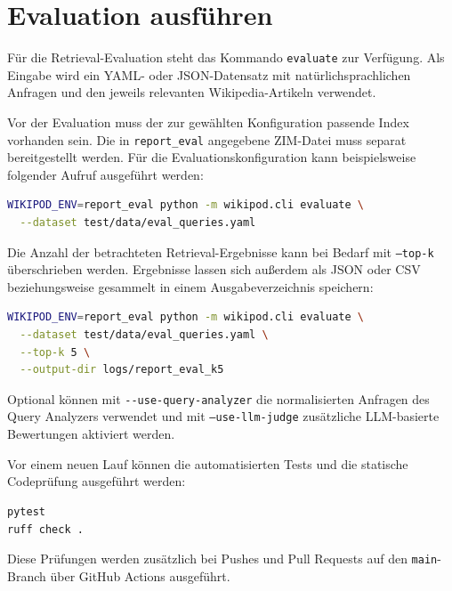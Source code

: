 \section{Evaluation ausführen}

Für die Retrieval-Evaluation steht das Kommando \texttt{evaluate} zur
Verfügung. Als Eingabe wird ein YAML- oder JSON-Datensatz mit
natürlichsprachlichen Anfragen und den jeweils relevanten Wikipedia-Artikeln
verwendet.

Vor der Evaluation muss der zur gewählten Konfiguration passende Index
vorhanden sein. Die in \texttt{report\_eval} angegebene ZIM-Datei muss
separat bereitgestellt werden. Für die Evaluationskonfiguration kann beispielsweise
folgender Aufruf ausgeführt werden:

\par\nopagebreak[4]\smallskip
\noindent\begin{minipage}[t]{\linewidth}
\vspace{0pt}
\begin{lstlisting}[language=bash]
WIKIPOD_ENV=report_eval python -m wikipod.cli evaluate \
  --dataset test/data/eval_queries.yaml
\end{lstlisting}
\end{minipage}\par\smallskip

Die Anzahl der betrachteten Retrieval-Ergebnisse kann bei Bedarf mit
\texttt{--top-k} überschrieben werden. Ergebnisse lassen sich außerdem als
JSON oder CSV beziehungsweise gesammelt in einem Ausgabeverzeichnis speichern:

\par\nopagebreak[4]\smallskip
\noindent\begin{minipage}[t]{\linewidth}
\vspace{0pt}
\begin{lstlisting}[language=bash]
WIKIPOD_ENV=report_eval python -m wikipod.cli evaluate \
  --dataset test/data/eval_queries.yaml \
  --top-k 5 \
  --output-dir logs/report_eval_k5
\end{lstlisting}
\end{minipage}\par\smallskip

Optional können mit \texttt{-\allowbreak{}-\allowbreak{}use-\allowbreak{}query-\allowbreak{}analyzer} die normalisierten Anfragen
des Query Analyzers verwendet und mit \texttt{--use-llm-judge} zusätzliche
LLM-basierte Bewertungen aktiviert werden.

Vor einem neuen Lauf können die automatisierten Tests und die statische
Codeprüfung ausgeführt werden:

\par\nopagebreak[4]\smallskip
\noindent\begin{minipage}[t]{\linewidth}
\vspace{0pt}
\begin{lstlisting}[language=bash]
pytest
ruff check .
\end{lstlisting}
\end{minipage}\par\smallskip

Diese Prüfungen werden zusätzlich bei Pushes und Pull Requests auf den
\texttt{main}-Branch über GitHub Actions ausgeführt.
\endgroup
